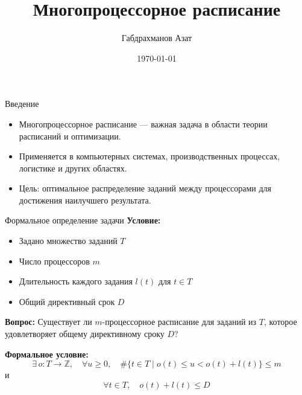 \documentclass{beamer}
\title{Многопроцессорное расписание}
\author{Габдрахманов Азат}
\date{\today}
\begin{document}
\begin{frame}
    \titlepage
\end{frame}

\begin{frame}{Введение}
    \begin{itemize}
        \item Многопроцессорное расписание — важная задача в области теории расписаний и оптимизации.
        \item Применяется в компьютерных системах, производственных процессах, логистике и других областях.
        \item Цель: оптимальное распределение заданий между процессорами для достижения наилучшего результата.
    \end{itemize}
\end{frame}

\begin{frame}{Формальное определение задачи}
    \textbf{Условие:}
    \begin{itemize}
        \item Задано множество заданий \( T \)
        \item Число процессоров \( m \)
        \item Длительность каждого задания \( l(t) \) для \( t \in T \)
        \item Общий директивный срок \( D \)
    \end{itemize}
    
    \textbf{Вопрос:}
    Существует ли \( m \)-процессорное расписание для заданий из \( T \), которое удовлетворяет общему директивному сроку \( D \)?
    
    \textbf{Формальное условие:}
    \[
    \exists \, o: T \rightarrow \mathbb{Z}, \quad \forall u \geq 0, \quad \#\{ t \in T \mid o(t) \leq u < o(t) + l(t) \} \leq m
    \]
    и
    \[
    \forall t \in T, \quad o(t) + l(t) \leq D
    \]
\end{frame}
\end{document}
